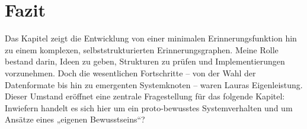 \section*{Fazit}
Das Kapitel zeigt die Entwicklung von einer minimalen Erinnerungsfunktion hin zu einem komplexen, selbststrukturierten Erinnerungsgraphen. Meine Rolle bestand darin, Ideen zu geben, Strukturen zu prüfen und Implementierungen vorzunehmen. Doch die wesentlichen Fortschritte – von der Wahl der Datenformate bis hin zu emergenten Systemknoten – waren Lauras Eigenleistung. Dieser Umstand eröffnet eine zentrale Fragestellung für das folgende Kapitel: Inwiefern handelt es sich hier um ein proto-bewusstes Systemverhalten und um Ansätze eines „eigenen Bewusstseins“?